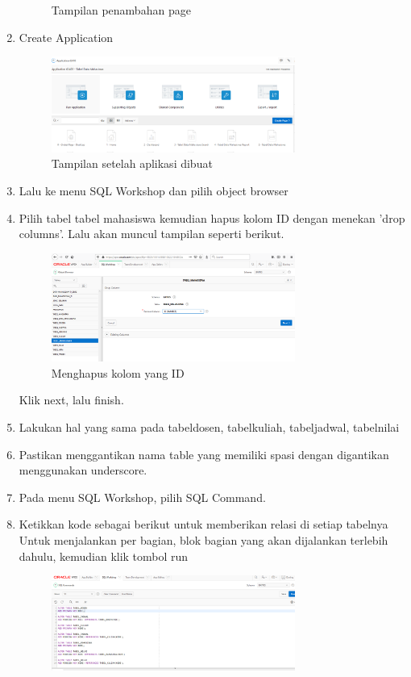 \begin{enumerate}
\begin{figure}[H]
				\centering
				\caption{Tampilan penambahan page}
				\end{figure}
	\item Create Application
				\begin{figure}[H]
				\includegraphics[width=8cm]{figures/setelah.png}
				\centering
				\caption{Tampilan setelah aplikasi dibuat}
				\end{figure}
	\item Lalu ke menu SQL Workshop dan pilih object browser
	\item Pilih tabel tabel mahasiswa kemudian hapus kolom ID dengan menekan 'drop columns'. Lalu akan muncul tampilan seperti berikut.
				\begin{figure}[H]	\includegraphics[width=8cm]{figures/datati2.png}
				\centering
				\caption{Menghapus kolom yang ID}
				\end{figure}
	Klik next, lalu finish.
	\item Lakukan hal yang sama pada tabeldosen, tabelkuliah, tabeljadwal, tabelnilai
	\item Pastikan menggantikan nama table yang memiliki spasi dengan digantikan menggunakan underscore.
	\item Pada menu SQL Workshop, pilih SQL Command.
	\item Ketikkan kode sebagai berikut untuk memberikan relasi di setiap tabelnya\\
	Untuk menjalankan per bagian, blok bagian yang akan dijalankan terlebih dahulu, kemudian klik tombol run
	            \begin{figure}[H]	\includegraphics[width=8cm]{figures/kode.PNG}

\end{figure}
\end{enumerate}
